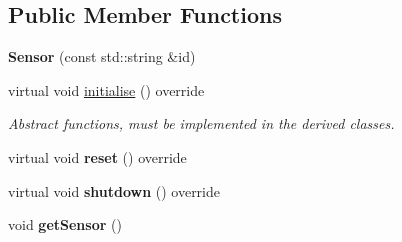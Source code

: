 \subsection*{Public Member Functions}
\begin{DoxyCompactItemize}
\item 
{\bfseries Sensor} (const std\+::string \&id)\hypertarget{class_sensor_a8615bafe3f2aa8f8b12b1199eaa577c4}{}\label{class_sensor_a8615bafe3f2aa8f8b12b1199eaa577c4}

\item 
virtual void \hyperlink{class_sensor_aa6175cacabc044409786f6d43a72ae29}{initialise} () override\hypertarget{class_sensor_aa6175cacabc044409786f6d43a72ae29}{}\label{class_sensor_aa6175cacabc044409786f6d43a72ae29}

\begin{DoxyCompactList}\small\item\em Abstract functions, must be implemented in the derived classes. \end{DoxyCompactList}\item 
virtual void {\bfseries reset} () override\hypertarget{class_sensor_a004fc50012f81dbfdce7a2541fa6130d}{}\label{class_sensor_a004fc50012f81dbfdce7a2541fa6130d}

\item 
virtual void {\bfseries shutdown} () override\hypertarget{class_sensor_a9b3ea7f61f41b68a4fb9141d887a7271}{}\label{class_sensor_a9b3ea7f61f41b68a4fb9141d887a7271}

\item 
void {\bfseries get\+Sensor} ()\hypertarget{class_sensor_a6ee10780572766a9488cb34f8d4d0550}{}\label{class_sensor_a6ee10780572766a9488cb34f8d4d0550}

\end{DoxyCompactItemize}
